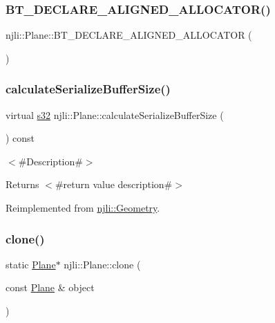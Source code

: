 \subsubsection{\texorpdfstring{B\+T\+\_\+\+D\+E\+C\+L\+A\+R\+E\+\_\+\+A\+L\+I\+G\+N\+E\+D\+\_\+\+A\+L\+L\+O\+C\+A\+T\+O\+R()}{BT\_DECLARE\_ALIGNED\_ALLOCATOR()}}
{\footnotesize\ttfamily njli\+::\+Plane\+::\+B\+T\+\_\+\+D\+E\+C\+L\+A\+R\+E\+\_\+\+A\+L\+I\+G\+N\+E\+D\+\_\+\+A\+L\+L\+O\+C\+A\+T\+OR (\begin{DoxyParamCaption}{ }\end{DoxyParamCaption})\hspace{0.3cm}{\ttfamily [protected]}}

\mbox{\label{classnjli_1_1_plane_a7f585c76d7bd568c089c91c12cba4982}} 
\subsubsection{\texorpdfstring{calculate\+Serialize\+Buffer\+Size()}{calculateSerializeBufferSize()}}
{\footnotesize\ttfamily virtual \mbox{\hyperlink{_util_8h_aa62c75d314a0d1f37f79c4b73b2292e2}{s32}} njli\+::\+Plane\+::calculate\+Serialize\+Buffer\+Size (\begin{DoxyParamCaption}{ }\end{DoxyParamCaption}) const\hspace{0.3cm}{\ttfamily [virtual]}}

$<$\#\+Description\#$>$

\begin{DoxyReturn}{Returns}
$<$\#return value description\#$>$ 
\end{DoxyReturn}


Reimplemented from \mbox{\hyperlink{classnjli_1_1_geometry_a8a14d6d068bf303718c1a92886f673b8}{njli\+::\+Geometry}}.

\mbox{\label{classnjli_1_1_plane_a42586e08719e750272614dbe1b1a077c}} 
\subsubsection{\texorpdfstring{clone()}{clone()}}
{\footnotesize\ttfamily static \mbox{\hyperlink{classnjli_1_1_plane}{Plane}}$\ast$ njli\+::\+Plane\+::clone (\begin{DoxyParamCaption}\item[{const \mbox{\hyperlink{classnjli_1_1_plane}{Plane}} \&}]{object }\end{DoxyParamCaption})\hspace{0.3cm}{\ttfamily [static]}}


